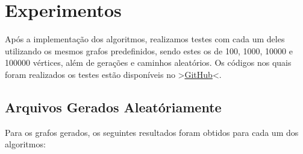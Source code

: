 \section{Experimentos}
Após a implementação dos algoritmos, realizamos testes com cada um deles utilizando os mesmos grafos predefinidos, sendo estes os de 100, 1000, 10000 e 100000 vértices, além de gerações e caminhos aleatórios. Os códigos nos quais foram realizados os testes estão disponíveis no >\href{https://github.com/thiagoteixas/TP-1-Grafos}{GitHub}<.

\subsection{Arquivos Gerados Aleatóriamente}

Para os grafos gerados, os seguintes resultados foram obtidos para cada um dos algoritmos:

